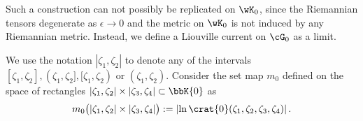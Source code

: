 \documentclass[reqno,11pt]{amsart}
\begin{document}
    Such a construction can not possibly be replicated on \(\wK_0\), since the Riemannian tensors degenerate as \(\epsilon \to 0\) and the metric on \(\wK_0\) is not induced by any Riemannian metric. 
    Instead, we define a Liouville current on \(\cG_0\) as a limit.
    
    \begin{defi}
    We use the notation \(|\zeta_1, \zeta_2|\) to denote any of the intervals \([\zeta_1, \zeta_2], (\zeta_1, \zeta_2], [\zeta_1, \zeta_2)\) or \((\zeta_1, \zeta_2)\). 
    Consider the set map \(m_0\) defined on the space of rectangles \(|\zeta_1, \zeta_2| \times |\zeta_3, \zeta_4| \subset \bbK{0}\) as   
    \[
        m_0\big(|\zeta_1, \zeta_2| \times |\zeta_3, \zeta_4|\big) 
        := \left| \ln \crat{0}(\zeta_1, \zeta_2, \zeta_3, \zeta_4) \right|.
    \]
    \end{defi}
    
\end{document}
